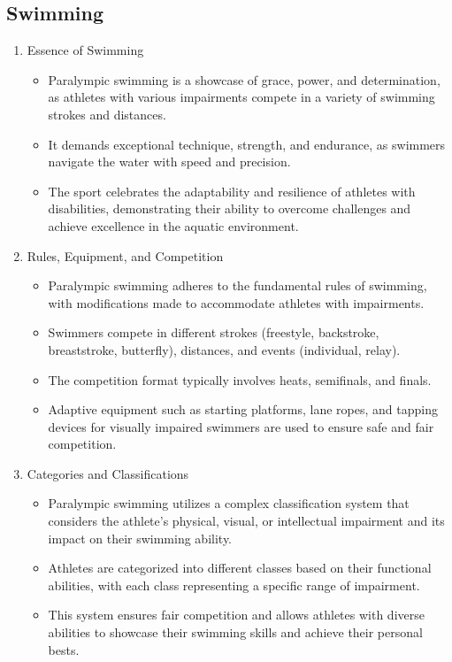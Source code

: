 \subsection{Swimming}

\begin{enumerate}

\item Essence of Swimming
    \begin{itemize}
    \item Paralympic swimming is a showcase of grace, power, and determination, as athletes with various impairments compete in a variety of swimming strokes and distances. 
    \item It demands exceptional technique, strength, and endurance, as swimmers navigate the water with speed and precision. 
    \item The sport celebrates the adaptability and resilience of athletes with disabilities, demonstrating their ability to overcome challenges and achieve excellence in the aquatic environment.
    \end{itemize}

\item Rules, Equipment, and Competition
    \begin{itemize}
    \item Paralympic swimming adheres to the fundamental rules of swimming, with modifications made to accommodate athletes with impairments. 
    \item Swimmers compete in different strokes (freestyle, backstroke, breaststroke, butterfly), distances, and events (individual, relay). 
    \item The competition format typically involves heats, semifinals, and finals. 
    \item Adaptive equipment such as starting platforms, lane ropes, and tapping devices for visually impaired swimmers are used to ensure safe and fair competition.
    \end{itemize}

\item Categories and Classifications
    \begin{itemize}
    \item Paralympic swimming utilizes a complex classification system that considers the athlete's physical, visual, or intellectual impairment and its impact on their swimming ability. 
    \item Athletes are categorized into different classes based on their functional abilities, with each class representing a specific range of impairment. 
    \item This system ensures fair competition and allows athletes with diverse abilities to showcase their swimming skills and achieve their personal bests.
    \end{itemize}

\end{enumerate}